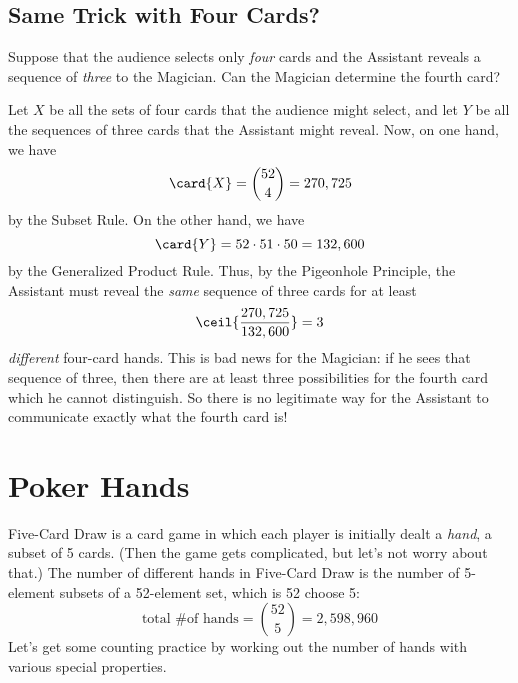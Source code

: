 \fi


\iffalse
http://people.brandeis.edu/~kleber/Papers/card.pdf

Also, \emph{Using a Card Trick to Teach Discrete Mathematics}, Simonson,
Shai, Holm, Tara S., Primus: Problems, Resources, and Issues in
Mathematics Undergraduate Studies, Sep 2003.
\fi

\subsection{Same Trick with Four Cards?}

Suppose that the audience selects only \emph{four} cards and the
Assistant reveals a sequence of \emph{three} to the Magician.  Can
the Magician determine the fourth card?

Let $X$ be all the sets of four cards that the audience might select,
and let $Y$ be all the sequences of three cards that the Assistant
might reveal.  Now, on one hand, we have
\[
\card{X} = \binom{52}{4} = 270,725
\]
by the Subset Rule.  On the other hand, we have
\[
\card{Y} = 52 \cdot 51 \cdot 50 = 132,600
\]
by the Generalized Product Rule.  Thus, by the Pigeonhole Principle, the
Assistant must reveal the \emph{same} sequence of three cards for at
least
\[
\ceil{\frac{270,725}{132,600}} = 3
\]
\emph{different} four-card hands.  This is bad news for the Magician:
if he sees that sequence of three, then there are at least three
possibilities for the fourth card which he cannot distinguish.  So there
is no legitimate way for the Assistant to communicate exactly what the
fourth card is!


\begin{problems}
\classproblems
{}

\end{problems}


\section{Poker Hands}

Five-Card Draw is a card game in which each player is initially dealt
a \emph{hand}, a subset of 5 cards.  (Then the game gets
complicated, but let's not worry about that.)  The number of different
hands in Five-Card Draw is the number of 5-element subsets of a
52-element set, which is 52 choose 5:
%
\[
\text{total \# of hands} = \binom{52}{5} = 2,598,960
\]
%
Let's get some counting practice by working out the number of hands
with various special properties.

